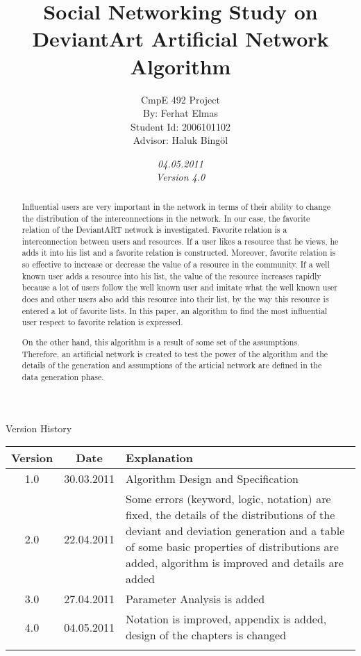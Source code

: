\documentclass[12pt,a4paper]{report}
\title{Social Networking Study on DeviantArt Artificial Network Algorithm}
\date{\emph{04.05.2011} \\ \emph{Version 4.0} }
\author{CmpE 492 Project\\
	By: Ferhat Elmas \\
	Student Id: 2006101102\\
	Advisor: Haluk Bing\"{o}l
}
\begin{document}

\maketitle

\begin{table}[htdp]
\begin{center}
\textup{\Huge Version History}
\begin{tabular}{|c|c|p{10cm}|}
\hline
\textbf{Version} & \textbf{Date} & \textbf{Explanation} \\
\hline
1.0 & 30.03.2011 & Algorithm Design and Specification \\
\hline
2.0& 22.04.2011 & Some errors (keyword, logic, notation) are fixed, the details of the distributions of the deviant and deviation generation and a table of some basic properties of distributions are added, algorithm is improved and details are added\\
\hline
3.0& 27.04.2011& Parameter Analysis is added\\
\hline
4.0& 04.05.2011& Notation is improved, appendix is added, design of the chapters is changed\\
\hline
&&\\
\hline
\end{tabular}
\end{center}
\end{table}


\begin{abstract}
	
	\par Influential users are very important in the network in terms of their ability to change the distribution of the interconnections in the network. In our case, the favorite relation of the DeviantART network is investigated. Favorite relation is a interconnection between users and resources. If a user likes a resource that he views, he adds it into his list and a favorite relation is constructed. Moreover, favorite relation is so effective to increase or decrease the value of a resource in the community. If a well known user adds a resource into his list, the value of the resource increases rapidly because a lot of users follow the well known user and imitate what the well known user does and other users also add this resource into their list, by the way this resource is entered a lot of favorite lists. In this paper, an algorithm to find the most influential user respect to favorite relation is expressed. 
	
	On the other hand, this algorithm is a result of some set of the assumptions. Therefore, an artificial network is created to test the power of the algorithm and the details of the generation and assumptions of the articial network are defined in the data generation phase.
\end{abstract}
\end{document}

